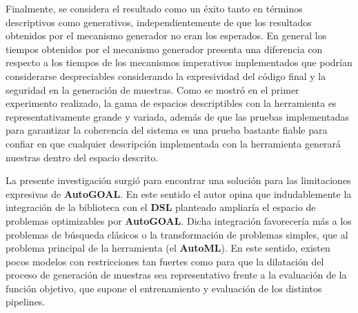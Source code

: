 Finalmente, se considera el resultado como un éxito tanto en términos descriptivos como generativos, independientemente
de que los resultados obtenidos por el mecanismo generador no eran los esperados. En general los tiempos obtenidos por el
mecanismo generador presenta una diferencia con respecto a los tiempos de los mecanismos imperativos implementados que podrían
considerarse despreciables considerando la expresividad del código final y la seguridad en la generación de muestras. Como se
mostró en el primer experimento realizado, la gama de espacios descriptibles con la herramienta es representativamente grande y
variada, además de que las pruebas implementadas para garantizar la coherencia del sistema es una prueba bastante fiable para
confiar en que cualquier descripción implementada con la herramienta generará nuestras dentro del espacio descrito.

La presente investigación surgió para encontrar una solución para las limitaciones expresivas de {\bf AutoGOAL}. En este
sentido el autor opina que indudablemente la integración de la biblioteca con el {\bf DSL} planteado ampliaría el espacio de problemas
optimizables por {\bf AutoGOAL}. Dicha integración favorecería más a los problemas de búsqueda clásicos o la
transformación de problemas simples, que al problema principal de la herramienta (el {\bf AutoML}). En este sentido, existen pocos modelos
con restricciones tan fuertes como para que la dilatación del proceso de generación de muestras sea representativo frente a la
evaluación de la función objetivo, que supone el entrenamiento y evaluación de los distintos pipelines.